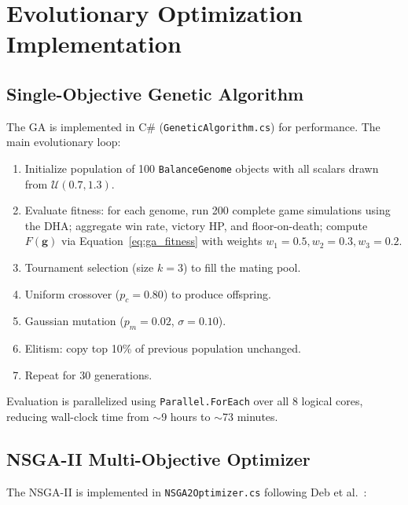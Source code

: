 \section{Evolutionary Optimization Implementation}

\subsection{Single-Objective Genetic Algorithm}

The GA is implemented in C\# (\texttt{GeneticAlgorithm.cs}) for performance. The main evolutionary loop:
\begin{enumerate}
    \item Initialize population of 100 \texttt{BalanceGenome} objects with all scalars drawn from $\mathcal{U}(0.7, 1.3)$.
    \item Evaluate fitness: for each genome, run 200 complete game simulations using the DHA; aggregate win rate, victory HP, and floor-on-death; compute $F(\mathbf{g})$ via Equation~\ref{eq:ga_fitness} with weights $w_1=0.5, w_2=0.3, w_3=0.2$.
    \item Tournament selection (size $k=3$) to fill the mating pool.
    \item Uniform crossover ($p_c = 0.80$) to produce offspring.
    \item Gaussian mutation ($p_m = 0.02$, $\sigma = 0.10$).
    \item Elitism: copy top 10\% of previous population unchanged.
    \item Repeat for 30 generations.
\end{enumerate}
Evaluation is parallelized using \texttt{Parallel.ForEach} over all 8 logical cores, reducing wall-clock time from $\sim$9 hours to $\sim$73 minutes.

\subsection{NSGA-II Multi-Objective Optimizer}

The NSGA-II is implemented in \texttt{NSGA2Optimizer.cs} following Deb et al.\ \cite{deb2002fast}:

